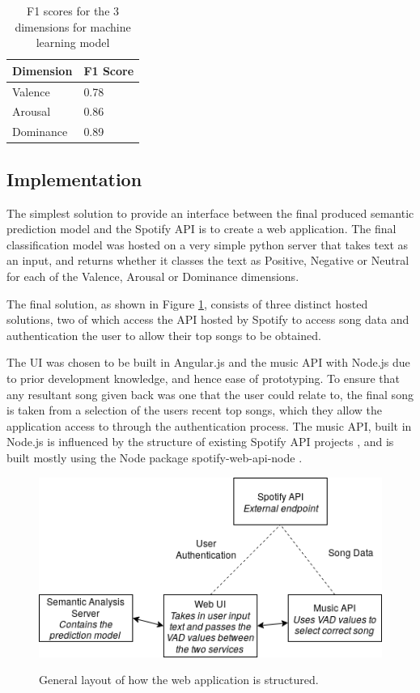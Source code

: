 \begin{table}
\centering
\label{ML:f1}
\caption{F1 scores for the 3 dimensions for machine learning model}
\begin{tabular}{ |p{3cm}|p{3cm}|}
 \hline
  Dimension & F1 Score \\
 \hline
  Valence & 0.78\\
  Arousal & 0.86 \\
  Dominance & 0.89\\
 \hline
\end{tabular}

\end{table}

\subsection{Implementation}

The simplest solution to provide an interface between the final produced semantic prediction model and the Spotify API is to create a web application. The final classification model was hosted on a very simple python server that takes text as an input, and returns whether it classes the text as Positive, Negative or Neutral for each of the Valence, Arousal or Dominance dimensions. 

The final solution, as shown in Figure \ref{implementationLayout}, consists of three distinct hosted solutions, two of which access the API hosted by Spotify to access song data and authentication the user to allow their top songs to be obtained.

The UI was chosen to be built in Angular.js and the music API with Node.js due to prior development knowledge, and hence ease of prototyping. 
To ensure that any resultant song given back was one that the user could relate to, the final song is taken from a selection of the users recent top songs, which they allow the application access to through the authentication process.
The music API, built in Node.js is influenced by the structure of existing Spotify API projects \cite{moodtape}, and is built mostly using the Node package spotify-web-api-node \cite{nodeSpotify}.

\begin{figure}[ht]
\caption{General layout of how the web application is structured.}
\centering
\includegraphics[scale=0.6]{litImgs/interfaceLayout.png}
\label{implementationLayout}
\end{figure}

